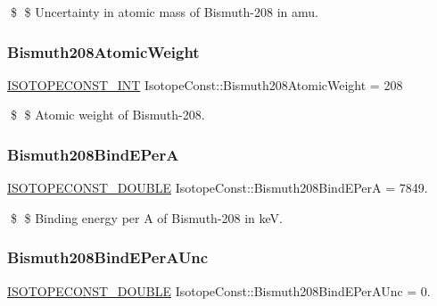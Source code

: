 \$ \$ Uncertainty in atomic mass of Bismuth-\/208 in amu. \mbox{\label{group___isotope_const-_bismuth-_bi208_ga58b395a05223b5c11aa0f8f3c5637777}} 
\subsubsection{\texorpdfstring{Bismuth208\+Atomic\+Weight}{Bismuth208AtomicWeight}}
{\footnotesize\ttfamily \mbox{\hyperlink{group___isotope_const-_macros_ga5f18360b3e99483a35c32d789e62621c}{I\+S\+O\+T\+O\+P\+E\+C\+O\+N\+S\+T\+\_\+\+I\+NT}} Isotope\+Const\+::\+Bismuth208\+Atomic\+Weight = 208}

\$ \$ Atomic weight of Bismuth-\/208. \mbox{\label{group___isotope_const-_bismuth-_bi208_ga46d6d56d52d32fc382852aa88d6d9e3e}} 
\subsubsection{\texorpdfstring{Bismuth208\+Bind\+E\+PerA}{Bismuth208BindEPerA}}
{\footnotesize\ttfamily \mbox{\hyperlink{group___isotope_const-_macros_ga8f45a7272ce02c0b4c65c44636ed719a}{I\+S\+O\+T\+O\+P\+E\+C\+O\+N\+S\+T\+\_\+\+D\+O\+U\+B\+LE}} Isotope\+Const\+::\+Bismuth208\+Bind\+E\+PerA = 7849.}

\$ \$ Binding energy per A of Bismuth-\/208 in keV. \mbox{\label{group___isotope_const-_bismuth-_bi208_ga483d007d71625d770771cfa3d26e55c7}} 
\subsubsection{\texorpdfstring{Bismuth208\+Bind\+E\+Per\+A\+Unc}{Bismuth208BindEPerAUnc}}
{\footnotesize\ttfamily \mbox{\hyperlink{group___isotope_const-_macros_ga8f45a7272ce02c0b4c65c44636ed719a}{I\+S\+O\+T\+O\+P\+E\+C\+O\+N\+S\+T\+\_\+\+D\+O\+U\+B\+LE}} Isotope\+Const\+::\+Bismuth208\+Bind\+E\+Per\+A\+Unc = 0.}

